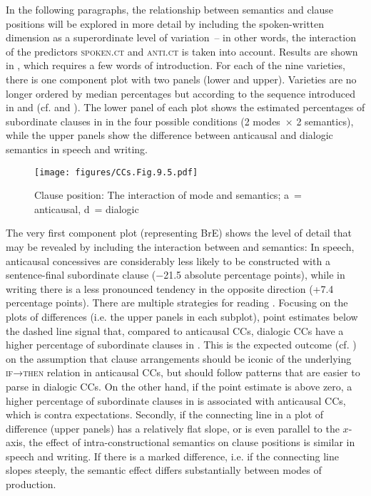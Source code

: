 In the following paragraphs, the relationship between semantics and clause positions will be explored in more detail by including the spoken-written dimension as a superordinate level of variation~– in other words, the interaction of the predictors \textsc{spoken.ct} and \textsc{anti.ct} is taken into account. Results are shown in , which requires a few words of introduction. For each of the nine varieties, there is one component plot with two panels (lower and upper). Varieties are no longer ordered by median percentages but according to the sequence introduced in  and  (cf.  and ). The lower panel of each plot shows the estimated percentages of subordinate clauses in  in the four possible conditions (2 modes~× 2 semantics), while the upper panels show the difference between anticausal and dialogic semantics in speech and writing.

\begin{figure}
\texttt{[image: figures/CCs.Fig.9.5.pdf]}
\caption{\label{bkm:Ref51165021}\label{fig:9.5}Clause position: The interaction of mode and semantics; a~= anticausal, d~= dialogic}
\end{figure}

The very first component plot (representing BrE) shows the level of detail that may be revealed by including the interaction between  and semantics: In speech, anticausal concessives are considerably less likely to be constructed with a sentence-final subordinate clause ($-$21.5 absolute percentage points), while in writing there is a less pronounced tendency in the opposite direction (+7.4 percentage points). There are multiple strategies for reading . Focusing on the plots of differences (i.e. the upper panels in each subplot), point estimates below the dashed line signal that, compared to anticausal CCs, dialogic CCs have a higher percentage of subordinate clauses in . This is the expected outcome (cf. ) on the assumption that clause arrangements should be iconic of the underlying \textsc{if→then} relation in anticausal CCs, but should follow patterns that are easier to parse in dialogic CCs. On the other hand, if the point estimate is above zero, a higher percentage of subordinate clauses in  is associated with anticausal CCs, which is contra expectations. Secondly, if the connecting line in a plot of difference (upper panels) has a relatively flat slope, or is even parallel to the $x$-axis, the effect of intra-constructional semantics on clause positions is similar in speech and writing. If there is a marked difference, i.e. if the connecting line slopes steeply, the semantic effect differs substantially between modes of production.

